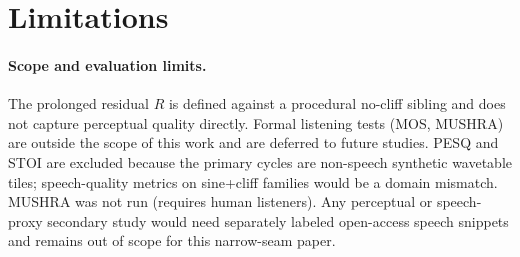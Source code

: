 \section{Limitations}
\label{sec:limitations}

\paragraph{Scope and evaluation limits.}
The prolonged residual $R$ is defined against a procedural no-cliff sibling and does not capture perceptual quality directly.
Formal listening tests (MOS, MUSHRA) are outside the scope of this work and are deferred to future studies.
PESQ and STOI are excluded because the primary cycles are non-speech synthetic wavetable tiles; speech-quality metrics on sine{+}cliff families would be a domain mismatch.
MUSHRA was not run (requires human listeners).
Any perceptual or speech-proxy secondary study would need separately labeled open-access speech snippets and remains out of scope for this narrow-seam paper.

